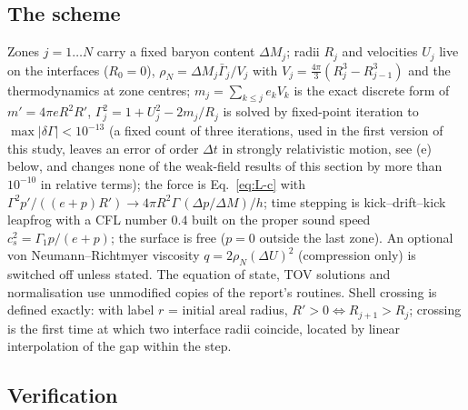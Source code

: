 \documentclass[11pt]{article}
\begin{document}
\subsection{The scheme}
\label{sec:lag-scheme}

Zones $j=1\ldots N$ carry a fixed baryon content $\Delta M_j$; radii $R_j$ and velocities $U_j$ live on the interfaces ($R_0=0$), $\rho_N=\Delta M_j\bar\Gamma_j/V_j$ with $V_j=\tfrac{4\pi}{3}(R_j^3-R_{j-1}^3)$ and the thermodynamics at zone centres; $m_j=\sum_{k\le j}e_kV_k$ is the exact discrete form of $m'=4\pi eR^2R'$, $\Gamma_j^2=1+U_j^2-2m_j/R_j$ is solved by fixed-point iteration to $\max|\delta\Gamma|<10^{-13}$ (a fixed count of three iterations, used in the first version of this study, leaves an error of order $\Delta t$ in strongly relativistic motion, see (e) below, and changes none of the weak-field results of this section by more than $10^{-10}$ in relative terms); the force is Eq.~\eqref{eq:L-c} with $\Gamma^2p'/((e+p)R')\to4\pi R^2\Gamma\,(\Delta p/\Delta M)/h$; time stepping is kick--drift--kick leapfrog with a CFL number $0.4$ built on the proper sound speed $c_s^2=\Gamma_1p/(e+p)$; the surface is free ($p=0$ outside the last zone).  An optional von Neumann--Richtmyer viscosity $q=2\rho_N(\Delta U)^2$ (compression only) is switched off unless stated.  The equation of state, TOV solutions and normalisation use unmodified copies of the report's routines.  Shell crossing is defined exactly: with label $r$ = initial areal radius, $R'>0\Leftrightarrow R_{j+1}>R_j$; crossing is the first time at which two interface radii coincide, located by linear interpolation of the gap within the step.

\subsection{Verification}
\label{sec:lag-verification}
\end{document}
